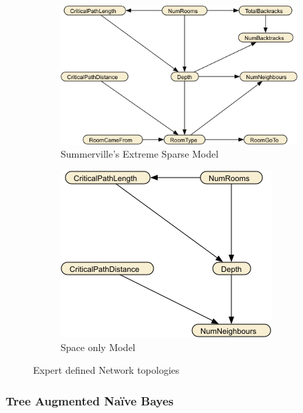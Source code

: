 \documentclass{UoYCSproject}
\begin{document}
\begin{figure}[htb]
  \centering
  \begin{subfigure}[b]{0.55\textwidth}
    \centering
    \includegraphics[width=\textwidth]{SESM_full.png}
    \caption{Summerville's Extreme Sparse Model}
    \label{fig:SESM}
  \end{subfigure}
  \hfill
  \begin{subfigure}[b]{0.35\textwidth}
    \centering
    \includegraphics[width=\textwidth]{SESM_space.png}
    \caption{Space only Model}
  \end{subfigure}
  \caption{Expert defined Network topologies}
  \label{fig:ExpertBNet}
\end{figure}

\subsubsection{Tree Augmented Na\"{i}ve Bayes}
\end{document}
